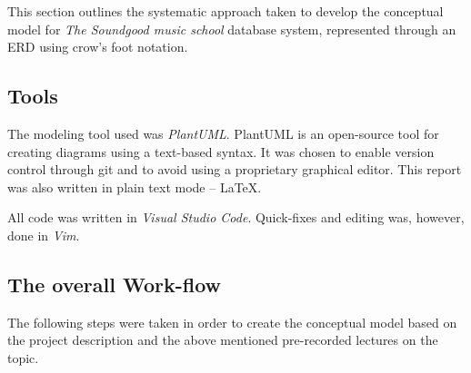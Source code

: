 \documentclass[a4paper]{scrartcl}
\begin{document}


This section outlines the systematic approach taken to develop the conceptual
model for 
\emph{The Soundgood music school} 
database system, represented through an
ERD using crow's foot notation.

\subsection*{Tools}
The modeling tool used was \emph{PlantUML}.
PlantUML is an open-source tool for creating diagrams using a text-based
syntax.
It was chosen to enable version control through git and to avoid using a
proprietary graphical editor.
This report was also written in plain text mode -- \LaTeX.

All code was written in \emph{Visual Studio Code}.
Quick-fixes and editing was, however, done in \emph{Vim}.

\subsection*{The overall Work-flow}
The following steps were taken in order to create the conceptual model based on
the project description 
and the above mentioned pre-recorded lectures on the topic.
\end{document}
